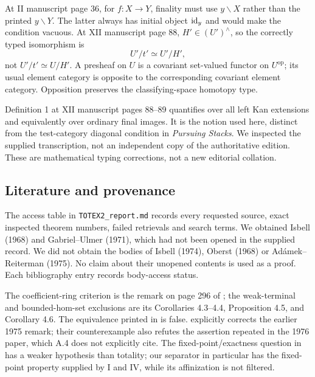 \begin{remark}\label{D:typing}
At II manuscript page 36, for $f:X\to Y$, finality must use
$y\backslash X$ rather than the printed $y\backslash Y$.
The latter always has initial object $\mathrm{id}_y$ and would make
the condition vacuous. At XII manuscript page 88,
$H'\in(U')^\wedge$, so the correctly typed isomorphism is
\[
 U'/t'\simeq U'/H',
\]
not $U'/t'\simeq U/H'$. A presheaf on $U$ is a covariant
set-valued functor on $U^{\mathrm{op}}$; its usual element
category is opposite to the corresponding covariant element
category. Opposition preserves the classifying-space homotopy type.

Definition 1 at XII manuscript pages 88--89 quantifies over
all left Kan extensions and equivalently over ordinary final
images. It is the notion used here, distinct from the
test-category diagonal condition in \emph{Pursuing Stacks}.
We inspected the supplied transcription, not an independent
copy of the authoritative edition. These are mathematical
typing corrections, not a new editorial collation.
\end{remark}

\subsection{Literature and provenance}
The access table in \texttt{TOTEX2\_report.md} records every
requested source, exact inspected theorem numbers, failed
retrievals and search terms. We obtained Isbell (1968) and
Gabriel--Ulmer (1971), which had not been opened in the
supplied record. We did not obtain the bodies of Isbell (1974),
Oberst (1968) or Ad\'amek--Reiterman (1975). No claim about
their unopened contents is used as a proof. Each bibliography
entry records body-access status.

The coefficient-ring criterion is the remark on page 296 of
\citet{IsbellMitchell1976}; the weak-terminal and bounded-hom-set
exclusions are its Corollaries 4.3--4.4, Proposition 4.5, and
Corollary 4.6. The equivalence printed in
\citet[II.3]{AdamekReiterman1976} is false.
\citet[Remark A.4]{AdamekKoubekReiterman1981} explicitly corrects
the earlier 1975 remark; their counterexample also refutes the
assertion repeated in the 1976 paper, which A.4 does not explicitly cite.
The fixed-point/exactness question in
\citet[Problem 2.5]{Husainov2002} has a weaker hypothesis
than totality; our separator in particular has the fixed-point
property supplied by I and IV, while its affinization is not filtered.

